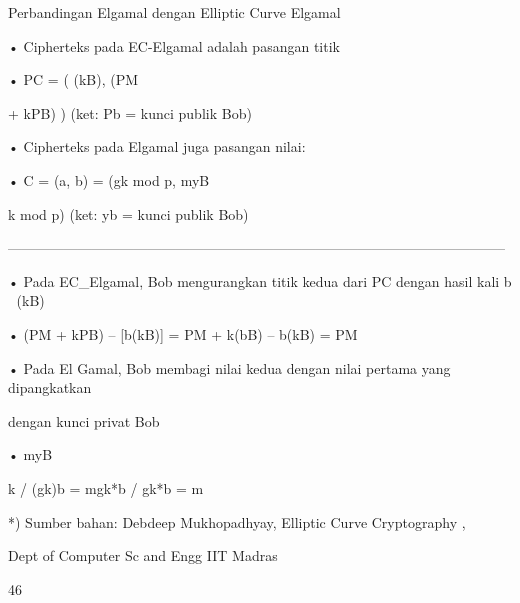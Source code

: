 \documentclass{article}
\begin{document}

Perbandingan Elgamal dengan Elliptic Curve Elgamal

• Cipherteks pada EC-Elgamal adalah pasangan  titik 

• PC = ( (kB), (PM

 + kPB) )            (ket: Pb = kunci publik Bob)

• Cipherteks pada Elgamal juga pasangan nilai:

• C = (a, b) = (gk mod p, myB

k mod p)    (ket: yb = kunci publik Bob)

-----------------------------------------------------------------------------------------------------------

• Pada EC\_Elgamal, Bob mengurangkan titik kedua  dari PC dengan hasil kali b  (kB)

• (PM + kPB) – [b(kB)] = PM + k(bB) – b(kB) = PM

• Pada El Gamal, Bob membagi nilai kedua dengan nilai pertama yang dipangkatkan 

dengan kunci privat Bob

• myB

k / (gk)b = mgk*b / gk*b = m

*) Sumber bahan: Debdeep Mukhopadhyay, Elliptic Curve Cryptography ,

 Dept of Computer Sc and Engg IIT Madras

46
\end{document}
